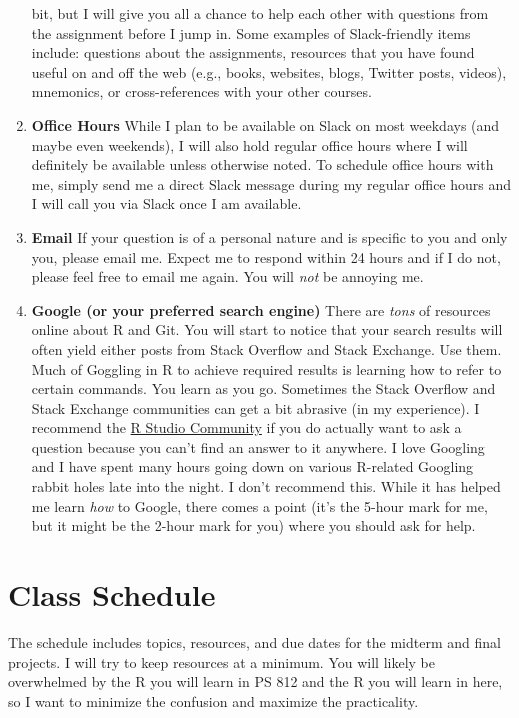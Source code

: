 \documentclass[11pt,]{article}
\begin{document}
\begin{enumerate}
  bit, but I will give you all a chance to help each other with
  questions from the assignment before I jump in. Some examples of
  Slack-friendly items include: questions about the assignments,
  resources that you have found useful on and off the web (e.g., books,
  websites, blogs, Twitter posts, videos), mnemonics, or
  cross-references with your other courses.
\item
  \textbf{Office Hours} While I plan to be available on Slack on most
  weekdays (and maybe even weekends), I will also hold regular office
  hours where I will definitely be available unless otherwise noted. To
  schedule office hours with me, simply send me a direct Slack message
  during my regular office hours and I will call you via Slack once I am
  available.
\item
  \textbf{Email} If your question is of a personal nature and is
  specific to you and only you, please email me. Expect me to respond
  within 24 hours and if I do not, please feel free to email me again.
  You will \emph{not} be annoying me.
\item
  \textbf{Google (or your preferred search engine)} There are
  \emph{tons} of resources online about R and Git. You will start to
  notice that your search results will often yield either posts from
  Stack Overflow and Stack Exchange. Use them. Much of Goggling in R to
  achieve required results is learning how to refer to certain commands.
  You learn as you go. Sometimes the Stack Overflow and Stack Exchange
  communities can get a bit abrasive (in my experience). I recommend the
  \href{https://community.rstudio.com/}{R Studio Community} if you do
  actually want to ask a question because you can't find an answer to it
  anywhere. I love Googling and I have spent many hours going down on
  various R-related Googling rabbit holes late into the night. I don't
  recommend this. While it has helped me learn \emph{how} to Google,
  there comes a point (it's the 5-hour mark for me, but it might be the
  2-hour mark for you) where you should ask for help.
\end{enumerate}

\hypertarget{class-schedule}{%
\section{Class Schedule}\label{class-schedule}}

The schedule includes topics, resources, and due dates for the midterm
and final projects. I will try to keep resources at a minimum. You will
likely be overwhelmed by the R you will learn in PS 812 and the R you
will learn in here, so I want to minimize the confusion and maximize the
practicality.
\end{document}
